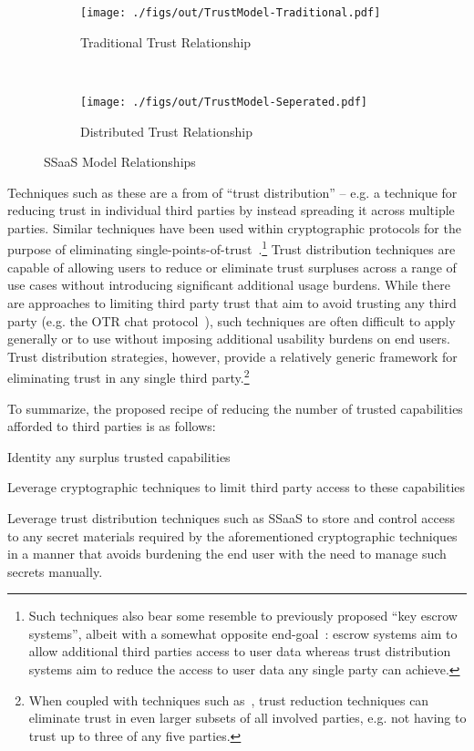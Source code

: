 \begin{figure}[t]
  \centering
  \begin{subfigure}[t]{0.48\textwidth}
    \centering
    \texttt{[image: ./figs/out/TrustModel-Traditional.pdf]}
    \caption{Traditional Trust Relationship}
    \label{fig:mitigation:trust:traditional}
  \end{subfigure}
  ~
  \begin{subfigure}[t]{0.48\textwidth}
    \centering
    \texttt{[image: ./figs/out/TrustModel-Seperated.pdf]}
    \caption{Distributed Trust Relationship}
    \label{fig:mitigation:trust:distributed}
  \end{subfigure}
  \caption{SSaaS Model Relationships}
  \label{fig:mitigation:trust}
\end{figure}

Techniques such as these are a from of ``trust distribution'' --
e.g. a technique for reducing trust in individual third parties by
instead spreading it across multiple parties. Similar techniques have
been used within cryptographic protocols for the purpose of
eliminating single-points-of-trust~\cite{shamir1979}.\footnote{Such
  techniques also bear some resemble to previously proposed ``key
  escrow systems'', albeit with a somewhat opposite
  end-goal~\cite{denning1996}: escrow systems aim to allow additional
  third parties access to user data whereas trust distribution systems
  aim to reduce the access to user data any single party can achieve.}
Trust distribution techniques are capable of allowing users to reduce
or eliminate trust surpluses across a range of use cases without
introducing significant additional usage burdens. While there are
approaches to limiting third party trust that aim to avoid trusting
any third party (e.g. the OTR chat protocol~\cite{otr-v3}), such
techniques are often difficult to apply generally or to use without
imposing additional usability burdens on end users. Trust distribution
strategies, however, provide a relatively generic framework for
eliminating trust in any single third party.\footnote{When coupled
  with techniques such as~\cite{shamir1979}, trust reduction
  techniques can eliminate trust in even larger subsets of all
  involved parties, e.g. not having to trust up to three of any five
  parties.}

To summarize, the proposed recipe of reducing the number of trusted
capabilities afforded to third parties is as follows:

\begin{packed_enum}
\item Identity any surplus trusted capabilities
\item Leverage cryptographic techniques to limit third party access to
  these capabilities
\item Leverage trust distribution techniques such as SSaaS to store
  and control access to any secret materials required by the
  aforementioned cryptographic techniques in a manner that avoids
  burdening the end user with the need to manage such secrets
  manually.
\end{packed_enum}

